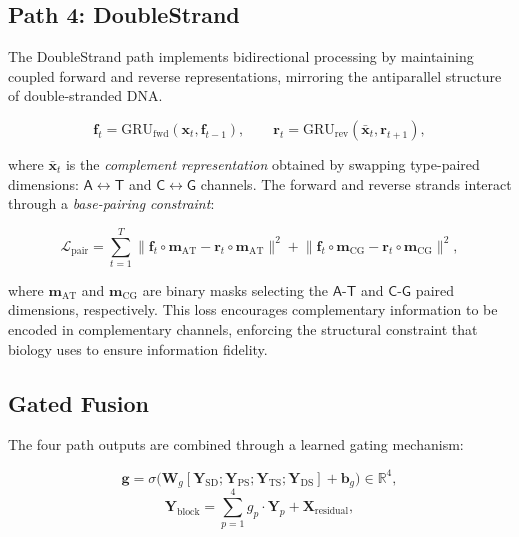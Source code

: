 \subsection{Path 4: DoubleStrand}
\label{sec:double-strand-path}

The DoubleStrand path implements bidirectional processing by maintaining coupled forward and reverse representations, mirroring the antiparallel structure of double-stranded DNA.

\begin{equation}
\mathbf{f}_t = \mathrm{GRU}_{\mathrm{fwd}}(\mathbf{x}_t, \mathbf{f}_{t-1}), \qquad \mathbf{r}_t = \mathrm{GRU}_{\mathrm{rev}}(\bar{\mathbf{x}}_t, \mathbf{r}_{t+1}),
\label{eq:double-strand}
\end{equation}

where $\bar{\mathbf{x}}_t$ is the \emph{complement representation} obtained by swapping type-paired dimensions: $\mathsf{A} \leftrightarrow \mathsf{T}$ and $\mathsf{C} \leftrightarrow \mathsf{G}$ channels. The forward and reverse strands interact through a \emph{base-pairing constraint}:

\begin{equation}
\mathcal{L}_{\mathrm{pair}} = \sum_{t=1}^{T} \bigl\| \mathbf{f}_t \circ \mathbf{m}_{\mathrm{AT}} - \mathbf{r}_t \circ \mathbf{m}_{\mathrm{AT}} \bigr\|^2 + \bigl\| \mathbf{f}_t \circ \mathbf{m}_{\mathrm{CG}} - \mathbf{r}_t \circ \mathbf{m}_{\mathrm{CG}} \bigr\|^2,
\label{eq:pairing-loss}
\end{equation}

where $\mathbf{m}_{\mathrm{AT}}$ and $\mathbf{m}_{\mathrm{CG}}$ are binary masks selecting the $\mathsf{A}$-$\mathsf{T}$ and $\mathsf{C}$-$\mathsf{G}$ paired dimensions, respectively. This loss encourages complementary information to be encoded in complementary channels, enforcing the structural constraint that biology uses to ensure information fidelity.

\subsection{Gated Fusion}
\label{sec:gated-fusion}

The four path outputs are combined through a learned gating mechanism:

\begin{equation}
\mathbf{g} = \sigma\bigl(\mathbf{W}_g [\mathbf{Y}_{\mathrm{SD}}; \mathbf{Y}_{\mathrm{PS}}; \mathbf{Y}_{\mathrm{TS}}; \mathbf{Y}_{\mathrm{DS}}] + \mathbf{b}_g\bigr) \in \mathbb{R}^4,
\label{eq:supreme-gated-fusion}
\end{equation}
\begin{equation}
\mathbf{Y}_{\mathrm{block}} = \sum_{p=1}^{4} g_p \cdot \mathbf{Y}_p + \mathbf{X}_{\mathrm{residual}},
\label{eq:fusion-output}
\end{equation}

